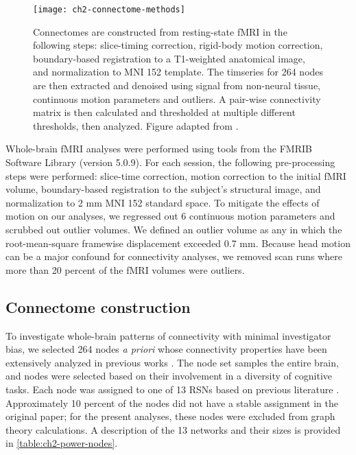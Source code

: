 \begin{itmeize}
\begin{figure}[t]
    \centering
    \texttt{[image: ch2-connectome-methods]}
    \caption[Schematic for connectome construction.]{Connectomes are constructed from resting-state fMRI in the following steps: slice-timing correction, rigid-body motion correction, boundary-based registration to a T1-weighted anatomical image, and normalization to MNI 152 template. The timseries for 264 nodes are then extracted and denoised using signal from non-neural tissue, continuous motion parameters and outliers. A pair-wise connectivity matrix is then calculated and thresholded at multiple different thresholds, then analyzed. Figure adapted from \citep{Yang2018}.}
    \label{fig:ch2-connectome-methods}
\end{figure}

Whole-brain fMRI analyses were performed using tools from the FMRIB Software Library (version 5.0.9). For each session, the following pre-processing steps were performed:  slice-time correction, motion correction to the initial fMRI volume, boundary-based registration to the subject's structural image, and normalization to 2 mm MNI 152 standard space. To mitigate the effects of motion on our analyses, we regressed out 6 continuous motion parameters and scrubbed out outlier volumes. We defined an outlier volume as any in which the root-mean-square framewise displacement exceeded 0.7 mm. Because head motion can be a major confound for connectivity analyses, we removed scan runs where more than 20 percent of the fMRI volumes were outliers.

\subsection{Connectome construction}

To investigate whole-brain patterns of connectivity with minimal investigator bias, we selected 264 nodes \textit{a priori} whose connectivity properties have been extensively analyzed in previous works \citep{Power2011}. The node set samples the entire brain, and nodes were selected based on their involvement in a diversity of cognitive tasks. Each node was assigned to one of 13 RSNs based on previous literature \citep{Power2013}. Approximately 10 percent of the nodes did not have a stable assignment in the original paper; for the present analyses, these nodes were excluded from graph theory calculations. A description of the 13 networks and their sizes is provided in \ref{table:ch2-power-nodes}. 


\end{itmeize}
